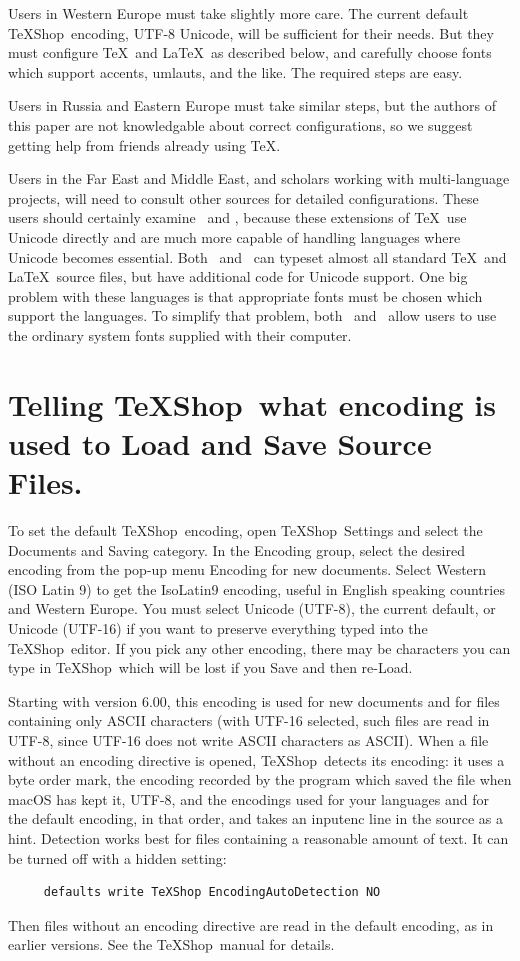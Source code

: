 \documentclass[letterpaper,11pt]{article}
\newcommand{\TS}{\textsf{\TeX Shop}}
\newcommand{\acr}[1]{\textsf{#1}}
\newcommand{\cmd}[1]{\textsf{#1}}
\begin{document}
Users in Western Europe must take slightly more care. The current default \TS\ encoding,
\acr{UTF-8 Unicode}, will be sufficient for their needs. But they must configure \TeX\ and \LaTeX\ as described below, and carefully choose fonts which support accents, umlauts, and the like.
The required steps are easy.

Users in Russia and Eastern Europe must take similar steps, but the authors of this paper
are not knowledgable about correct configurations, so we suggest getting help from
friends already using \TeX.

Users in the Far East and Middle East, and scholars working with multi-language projects,
will need to consult other sources for detailed configurations. These users should certainly
examine \XeTeX\ and \LuaTeX, because these extensions of \TeX\ use \cmd{Unicode} directly and are
much more capable of handling languages where \cmd{Unicode} becomes essential. Both \XeTeX\ and
\LuaTeX\ can typeset almost all standard \TeX\ and \LaTeX\ source files, but have additional
code for \cmd{Unicode} support. One big problem with these languages is that appropriate fonts must be chosen which support the languages. To simplify that problem,
both \XeTeX\ and \LuaTeX\ allow users to use the ordinary system fonts supplied with their computer.

\section{Telling \TS\ what encoding is used to Load and Save Source Files.}\label{telltexshop}

To set the default \TS\ encoding, open \TS\ Settings and select the \cmd{Documents and Saving} category.
In the \cmd{Encoding} group, select the desired encoding from the pop-up menu \cmd{Encoding for new documents}. Select \acr{Western (ISO Latin 9)} to get the \acr{IsoLatin9} encoding, useful in English speaking countries and Western Europe. You must select
\acr{Unicode (UTF-8)}, the current default, or \acr{Unicode (UTF-16)} if you want to preserve everything typed into the \TS\ editor. If you pick any other encoding, there may be characters you can type in \TS\
which will be lost if you Save and then re-Load.

Starting with version 6.00, this encoding is used for new documents and for files containing only \acr{ASCII} characters (with \acr{UTF-16} selected, such files are read in \acr{UTF-8}, since \acr{UTF-16} does not write \acr{ASCII} characters as \acr{ASCII}). When a file without an encoding directive is opened, \TS\ detects its encoding: it uses a byte order mark, the encoding recorded by the program which saved the file when macOS has kept it, \acr{UTF-8}, and the encodings used for your languages and for the default encoding, in that order, and takes an \cmd{inputenc} line in the source as a hint. Detection works best for files containing a reasonable amount of text. It can be turned off with a hidden setting:
\begin{verbatim}
     defaults write TeXShop EncodingAutoDetection NO
\end{verbatim}
Then files without an encoding directive are read in the default encoding, as in earlier versions. See the \TS\ manual for details.
\end{document}
